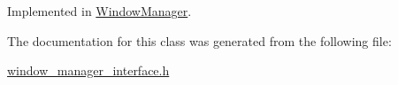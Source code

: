 Implemented in \hyperlink{classWindowManager_af5e3a6217eaba1bbbf4b7f1d45707467}{Window\-Manager}.



The documentation for this class was generated from the following file\-:\begin{DoxyCompactItemize}
\item 
\hyperlink{window__manager__interface_8h}{window\-\_\-manager\-\_\-interface.\-h}\end{DoxyCompactItemize}
